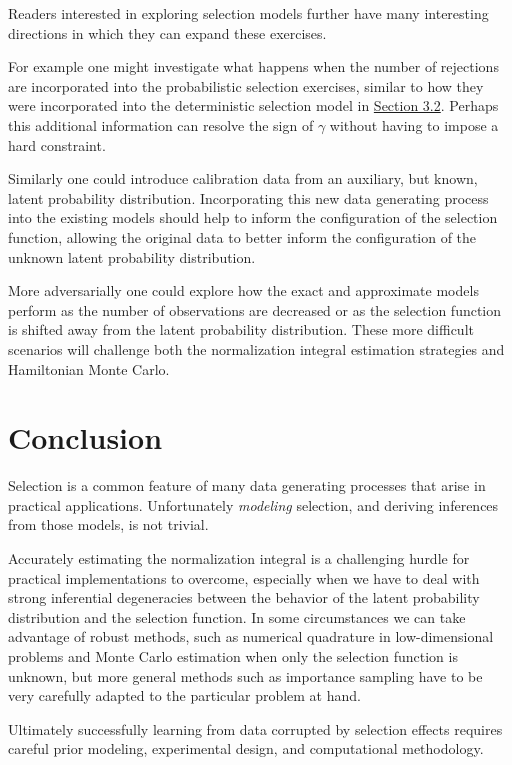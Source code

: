 \documentclass[
  letterpaper,
  DIV=11,
  numbers=noendperiod]{scrartcl}
\begin{document}
Readers interested in exploring selection models further have many
interesting directions in which they can expand these exercises.

For example one might investigate what happens when the number of
rejections are incorporated into the probabilistic selection exercises,
similar to how they were incorporated into the deterministic selection
model in \href{@ec:demo_deterministic}{Section 3.2}. Perhaps this
additional information can resolve the sign of \(\gamma\) without having
to impose a hard constraint.

Similarly one could introduce calibration data from an auxiliary, but
known, latent probability distribution. Incorporating this new data
generating process into the existing models should help to inform the
configuration of the selection function, allowing the original data to
better inform the configuration of the unknown latent probability
distribution.

More adversarially one could explore how the exact and approximate
models perform as the number of observations are decreased or as the
selection function is shifted away from the latent probability
distribution. These more difficult scenarios will challenge both the
normalization integral estimation strategies and Hamiltonian Monte
Carlo.

\section{Conclusion}\label{conclusion}

Selection is a common feature of many data generating processes that
arise in practical applications. Unfortunately \emph{modeling}
selection, and deriving inferences from those models, is not trivial.

Accurately estimating the normalization integral is a challenging hurdle
for practical implementations to overcome, especially when we have to
deal with strong inferential degeneracies between the behavior of the
latent probability distribution and the selection function. In some
circumstances we can take advantage of robust methods, such as numerical
quadrature in low-dimensional problems and Monte Carlo estimation when
only the selection function is unknown, but more general methods such as
importance sampling have to be very carefully adapted to the particular
problem at hand.

Ultimately successfully learning from data corrupted by selection
effects requires careful prior modeling, experimental design, and
computational methodology.
\end{document}
